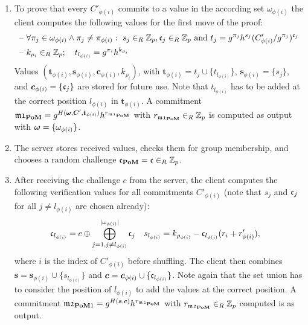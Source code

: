 \begin{enumerate}
  \item %
    To prove that every $C'_{\phi(i)}$ commits to a value in the according set $\omega_{\phi(i)}$ the client computes the following values for the first move of the proof:
    \begin{align*}
    \text{--}~ & \forall \pi_j\in\omega_{\phi(i)} \wedge \pi_j\not=\pi_{\phi(i)} :~ s_j\in_R\mathbb{Z}_p, \mathfrak{c}_j\in_R\mathbb{Z}_p \text{ and } t_j=g^{\pi_j}h^{s_j}(C'_{\phi(i)}/g^{\pi_j})^{\mathfrak{c}_j} \\      
    \text{--}~ & k_{\rho_i}\in_R\mathbb{Z}_p;\quad t_{l_{\phi(i)}}=g^{\pi_i}h^{k_{\rho_i}}
    \end{align*}
    Values $(\bm t_{\phi(i)}, \bm s_{\phi(i)}, \bm c_{\phi(i)}, k_{\rho_i})$, with $\bm t_{\phi(i)}=t_j \cup \{t_{l_{\phi(i)}}\}$, $\bm s_{\phi(i)}=\{s_j\}$, and $\bm c_{\phi(i)}=\{\mathfrak{c}_j\}$ are stored for future use.
    Note that $t_{l_{\phi(i)}}$ has to be added at the correct position $l_{\phi(i)}$ in $\bm t_{\phi(i)}$.
    A commitment $\mathfrak{m1}_{\mathsf{\bf PoM}}=g^{H(\boldsymbol{\mathbf{\omega}}, \bm C', \bm t_{\phi(i)})} h^{r_{\mathfrak{m1}_\mathsf{\bf PoM}}}$ with $r_{\mathfrak{m1}_\mathsf{\bf PoM}}\in_R\mathbb{Z}_p$ is computed as output with $\boldsymbol{\mathbf{\omega}}=\{\omega_{\phi(i)}\}$.

  \item %
    The server stores received values, checks them for group membership, and chooses a random challenge $\mathfrak{c}_\mathsf{\bf PoM}=\mathfrak{c}\in_R\mathbb{Z}_p$.

  \item %
    After receiving the challenge $c$ from the server, the client computes the following verification values for all commitments $C'_{\phi(i)}$ (note that $s_j$ and $\mathfrak{c}_j$ for all $j\not= l_{\phi(i)}$ are chosen already):
    \begin{align*}      
     & \mathfrak{c}_{l_{\phi(i)}}=c\oplus \bigoplus_{j=1,j\not=l_{\phi(i)}}^{|\omega_{\phi(i)}|} \mathfrak{c}_j
     && s_{l_{\phi(i)}}=k_{\rho_{\phi(i)}} - \mathfrak{c}_{l_{\phi(i)}}(r_{i}+r'_{\phi(i)}),
    \end{align*}
    where $i$ is the index of $C'_{\phi(i)}$ before shuffling.
    The client then combines $\bm s = \bm s_{\phi(i)} \cup \{s_{l_{\phi(i)}}\}$ and $\bm c = \bm c_{\phi(i)} \cup \{\mathfrak{c}_{l_{\phi(i)}}\}$.
    Note again that the set union has to consider the position of $l_{\phi(i)}$ to add the values at the correct position.
    A commitment $\mathfrak{m2}_{\mathsf{\bf PoM}1}=g^{H(\bm s, \bm c)} h^{r_{\mathfrak{m2}_\mathsf{\bf PoM}}}$ with $r_{\mathfrak{m2}_\mathsf{\bf PoM}}\in_R\mathbb{Z}_p$ computed is as output.


\end{enumerate}
